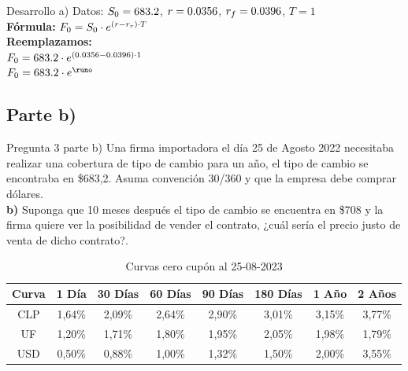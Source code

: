 \documentclass{beamer}
\newif\ifpresentacion
\newcommand{\pausa}{\ifpresentacion\pause\fi}
\begin{document}
\begin{frame}{Desarrollo a)}
Datos: $S_0= 683.2$, $ r=0.0356$, $r_f=0.0396$, $T=1$\\
\pausa
\vspace{0.5em}
\textbf{Fórmula:} \textcolor{blue}{\(F_0 = S_0 \cdot{e^{\left(r-r_r\right) \cdot T}}\)}\\
\pausa
\textbf{Reemplazamos:}\\
\(F_0= 683.2 \cdot e^{(0.0356-0.0396)\cdot 1}\)\\
\pausa
\(F_0= \pdolaruno \cdot e^{\runo}\)\\
\pausa
{}
\end{frame}

\subsection{Parte b)}

\begin{frame}{Pregunta 3 parte b)}
  Una firma importadora el día 25 de Agosto 2022 necesitaba realizar una cobertura de tipo de cambio 
para un año, el tipo de cambio se encontraba en \$683,2. Asuma convención 30/360 y que la empresa debe comprar dólares.\\

\textbf{b)} Suponga que 10 meses después el tipo de cambio se encuentra en \$708 y la firma quiere ver
  la posibilidad de vender el contrato, ¿cuál sería el precio justo de venta de dicho contrato?.
  \begin{table}[h!]
      \centering
      \scriptsize
      \caption{Curvas cero cupón al 25-08-2023}
      \begin{tabular}{|c|c|c|c|c|c|c|c|}
      \hline
      \textbf{Curva} & \textbf{1 Día} & \textbf{30 Días} & \textbf{60 Días} & \textbf{90 Días} & \textbf{180 Días} & \textbf{1 Año} & \textbf{2 Años} \\
      \hline
      CLP & 1{,}64\% & 2{,}09\% & 2{,}64\% & 2{,}90\% & 3{,}01\% & 3{,}15\% & 3{,}77\% \\
      UF  & 1{,}20\% & 1{,}71\% & 1{,}80\% & 1{,}95\% & 2{,}05\% & 1{,}98\% & 1{,}79\% \\
      USD & 0{,}50\% & 0{,}88\% & 1{,}00\% & 1{,}32\% & 1{,}50\% & 2{,}00\% & 3{,}55\% \\
      \hline
      \end{tabular}
  \end{table}  
\end{frame}
\end{document}
